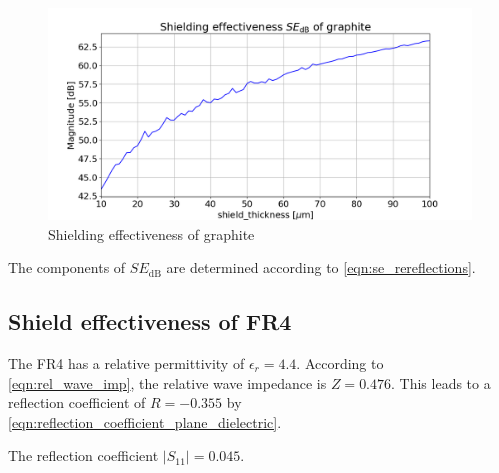 \begin{figure}[h]
    \centering
    \includegraphics[width=1\linewidth]{Documentation//content//30_simulations//img/se_graphite.png}
    \caption{Shielding effectiveness of graphite}
    \label{fig:se_graphite}
\end{figure}


The components of $SE_\mathrm{dB}$ are determined according to \autoref{eqn:se_rereflections}. 

\subsection{Shield effectiveness of FR4}

The FR4 has a relative permittivity of $\epsilon_r=4.4$. According to \autoref{eqn:rel_wave_imp}, the relative wave impedance is $Z=0.476$. This leads to a reflection coefficient of $R=-0.355$ by \autoref{eqn:reflection_coefficient_plane_dielectric}.


The reflection coefficient $|S_{11}|=0.045$.
